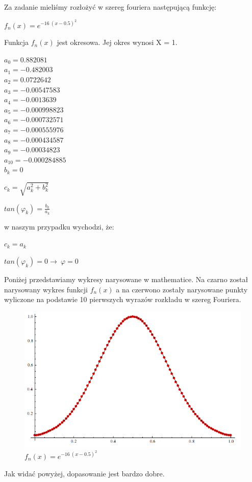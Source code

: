 \documentclass[a4paper,11pt]{article}
\author{Justyna Ilczuk, Jacek Rosiński}
\begin{document}
\pagestyle{fancy}
\fancyfoot[CO]{\ }
\fancyhead[RO]{\footnotesize{\thepage} }


Za zadanie mieliśmy rozłożyć w szereg fouriera następującą funkcję:

\(f_n(x) = e^{-16\ (x - 0.5)^2} \)

Funkcja \(f_n(x) \) jest okresowa. Jej okres wynosi X = 1. 

\(a_0 = 0.882081 \) \\
\(a_1 = -0.482003 \) \\
\(a_2 =  0.0722642\) \\
\(a_3 = -0.00547583 \) \\
\(a_4 = -0.0013639 \) \\
\(a_5 = -0.000998823 \) \\
\(a_6 = -0.000732571 \) \\
\(a_7 = -0.000555976 \) \\
\(a_8 = -0.000434587 \) \\
\(a_9 = -0.00034823 \) \\
\(a_{10} = -0.000284885 \) \\

\(b_k = 0 \)

\(c_k = \sqrt{a_k^2 + b_k^2} \)

\(tan (\varphi _k) = \frac{b_k} {a_k} \)

w naszym przypadku wychodzi, że:

\(c_k = a_k \)

\(tan (\varphi _k) = 0 \rightarrow \ \varphi = 0 \)

Poniżej przedstawiamy wykresy narysowane w mathematice. Na czarno został narysowany wykres funkcji \(f_n(x) \) a na czerwono zostały narysowane punkty wyliczone na podstawie 10 pierwszych wyrazów rozkładu w szereg Fouriera.

\begin{figure} [H]
  \begin{center}
    \includegraphics{fourier.png}
    \caption{\(f_n(x) = e^{-16\ (x - 0.5)^2} \)}
  \end{center}
\end{figure}

Jak widać powyżej, dopasowanie jest bardzo dobre.
\end{document}
